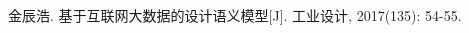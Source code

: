 
\begin{publications}{99}
  \item\textsc{金辰浩}. {基于互联网大数据的设计语义模型}[J]. 工业设计, 2017(135): 54-55.
\end{publications}
